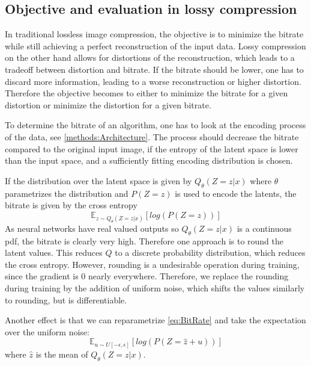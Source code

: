 \subsection{Objective and evaluation in lossy compression}
    In traditional lossless image compression, the objective is to minimize the
    bitrate while still achieving a perfect reconstruction of the input data.
    Lossy compression on the other hand allows for distortions of the
    reconstruction, which leads to a tradeoff between distortion and bitrate. If
    the bitrate should be lower, one has to discard more information, leading to
    a worse reconstruction or higher distortion. Therefore the objective becomes
    to either to minimize the bitrate for a given distortion or minimize the
    distortion for a given bitrate.

    To determine the bitrate of an algorithm, one has to look at the encoding
    process of the data, see \ref{methods:Architecture}. The process should
    decrease the bitrate compared to the original input image, if the entropy of
    the latent space is lower than the input space, and a sufficiently fitting
    encoding distribution is chosen.

    If the distribution over the latent space is given by $Q_\theta(Z=z \vert x)$ where
    $\theta$ parametrizes the distribution and $P(Z=z)$ is used to encode the
    latents, the bitrate is given by the cross entropy
    \begin{equation}\label{eq:BitRate}
        \mathbb{E}_{z \sim Q_\theta(Z=z \vert x)}[log(P(Z=z))]
    \end{equation}
    As neural networks have real valued outputs so $Q_\theta(Z=z \vert x)$ is a
    continuous pdf, the bitrate is clearly very high. Therefore one approach is
    to round the latent values. This reduces $Q$ to a discrete probability
    distribution, which reduces the cross entropy. However, rounding is a
    undesirable operation during training, since the gradient is 0 nearly
    everywhere. Therefore, we replace the rounding during training by the
    addition of uniform noise, which shifts the values similarly to rounding,
    but is differentiable.
    
    Another effect is that we can reparametrize \ref{eq:BitRate} and take the
    expectation over the uniform noise:
    \begin{equation}
        \mathbb{E}_{u \sim U[-\epsilon, \epsilon]}[log(P(Z=\hat{z} + u))]
    \end{equation}
    where $\hat{z}$ is the mean of $Q_\theta(Z=z \vert x)$.

